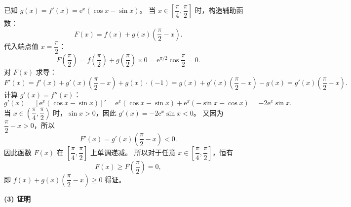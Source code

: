 \begin{answer}
已知 $g(x) = f'(x) = \mathrm{e}^x(\cos x - \sin x)$。
当 $x \in \left[\dfrac{\pi}{4}, \dfrac{\pi}{2}\right]$ 时，构造辅助函数：
\nopagebreak[4]
\[F(x) = f(x) + g(x)\left(\frac{\pi}{2} - x\right).\]
代入端点值 $x = \dfrac{\pi}{2}$：
\nopagebreak[4]
\[F\left(\frac{\pi}{2}\right) = f\left(\frac{\pi}{2}\right) + g\left(\frac{\pi}{2}\right) \times 0 = \mathrm{e}^{\pi/2} \cos\frac{\pi}{2} = 0.\]
对 $F(x)$ 求导：
\nopagebreak[4]
\[F'(x) = f'(x) + g'(x)\left(\frac{\pi}{2} - x\right) + g(x) \cdot (-1) = g(x) + g'(x)\left(\frac{\pi}{2} - x\right) - g(x) = g'(x)\left(\frac{\pi}{2} - x\right).\]
计算 $g'(x) = f''(x)$：
\nopagebreak[4]
\[g'(x) = [\mathrm{e}^x(\cos x - \sin x)]' = \mathrm{e}^x(\cos x - \sin x) + \mathrm{e}^x(-\sin x - \cos x) = -2\mathrm{e}^x \sin x.\]
当 $x \in \left(\dfrac{\pi}{4}, \dfrac{\pi}{2}\right)$ 时，$\sin x > 0$，因此 $g'(x) = -2\mathrm{e}^x \sin x < 0$。
又因为 $\dfrac{\pi}{2} - x > 0$，所以
\nopagebreak[4]
\[F'(x) = g'(x)\left(\frac{\pi}{2} - x\right) < 0.\]
因此函数 $F(x)$ 在 $\left[\dfrac{\pi}{4}, \dfrac{\pi}{2}\right]$ 上单调递减。
所以对于任意 $x \in \left[\dfrac{\pi}{4}, \dfrac{\pi}{2}\right]$，恒有
\nopagebreak[4]
\[F(x) \geqslant F\left(\frac{\pi}{2}\right) = 0,\]
即 $f(x) + g(x)\left(\dfrac{\pi}{2} - x\right) \geqslant 0$ 得证。

\textbf{(3) 证明}


\end{answer}
